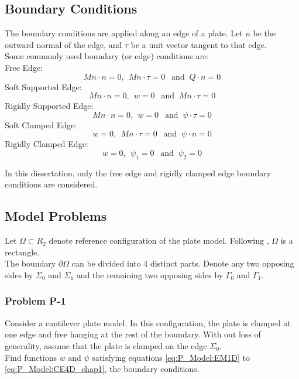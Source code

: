 \documentclass[../../main.tex]{subfiles}
\begin{document}
	\subsection{Boundary Conditions}\label{ssec:P_Model:BoundaryConditions}
	The boundary conditions are applied along an edge of a plate. Let $n$ be the outward normal of the edge, and $\tau$ be a unit vector tangent to that edge.\\
	
	Some commonly used boundary (or edge) conditions are:\\
	
	Free Edge:
	\[Mn\cdot n = 0, \ \ Mn\cdot \tau = 0 \ \ \textrm{ and }\ Q\cdot n = 0 \]
	Soft Supported Edge:
	\[Mn\cdot n = 0, \ \ w = 0 \ \ \textrm{ and } \ Mn \cdot \tau = 0 \]
	Rigidly Supported Edge:
	\[Mn\cdot n = 0, \ \ w = 0 \ \ \textrm{ and } \ {\psi} \cdot \tau = 0 \]
	Soft Clamped Edge:
	\[w = 0, \ \ Mn \cdot \tau = 0 \ \ \textrm{ and } \ \psi \cdot n = 0 \]
	Rigidly Clamped Edge:
	\[w = 0, \ \ \psi_1 = 0 \ \ \textrm{ and } \ \psi_2 = 0 \]
	
	In this dissertation, only the free edge and rigidly clamped edge boundary conditions are considered.
	
	\subsection{Model Problems}\label{ssec:P_Model:ModelProblems}
	Let $\Omega \subset R_2$ denote reference configuration of the plate model. Following \cite{Wu05}, $\Omega$ is a rectangle.\\
	
	The boundary $\partial \Omega$ can be divided into 4 distinct parts. Denote any two opposing sides by $\Sigma_0$ and $\Sigma_1$ and the remaining two opposing sides by $\Gamma_0$ and $\Gamma_1$.
	
	\subsubsection{Problem P-1}\label{sssec:P_Model:ProblemP1}
	Consider a cantilever plate model. In this configuration, the plate is clamped at one edge and free hanging at the rest of the boundary. With out loss of generality, assume that the plate is clamped on the edge $\Sigma_0$.\\

	Find functions $w$ and $\psi$ satisfying equations \eqref{eq:P_Model:EM1D} to \eqref{eq:P_Model:CE4D_chap1}, the boundary conditions.\\
	
\end{document}
